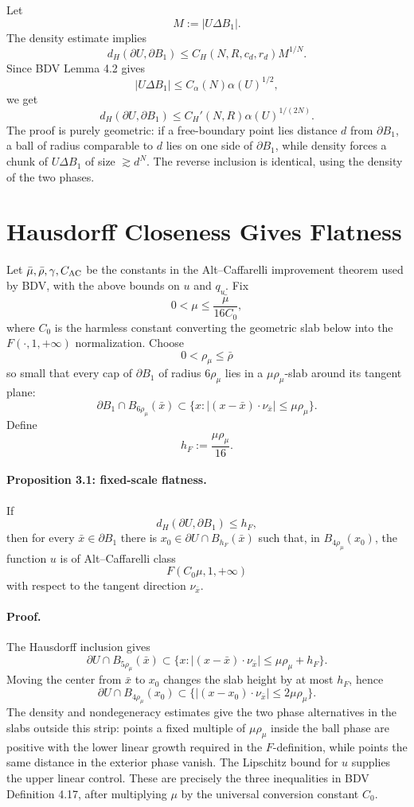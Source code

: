 \documentclass[11pt]{article}
\begin{document}
Let
\[
M:=|U\Delta B_1|.
\]
The density estimate implies
\[
d_H(\partial U,\partial B_1)
\le C_H(N,R,c_d,r_d)M^{1/N}.
\]
Since BDV Lemma 4.2 gives
\[
|U\Delta B_1|\le C_\alpha(N)\alpha(U)^{1/2},
\]
we get
\[
\boxed{
d_H(\partial U,\partial B_1)
\le
C_H'(N,R)\alpha(U)^{1/(2N)}.
}
\]
The proof is purely geometric: if a free-boundary point lies distance \(d\)
from \(\partial B_1\), a ball of radius comparable to \(d\) lies on one side of
\(\partial B_1\), while density forces a chunk of \(U\Delta B_1\) of size
\(\gtrsim d^N\). The reverse inclusion is identical, using the density of the
two phases.

\section{Hausdorff Closeness Gives Flatness}

Let \(\bar\mu,\bar\rho,\gamma,C_{\rm AC}\) be the constants in the
Alt--Caffarelli improvement theorem used by BDV, with the above bounds on
\(u\) and \(q_u\). Fix
\[
0<\mu\le \frac{\bar\mu}{16C_0},
\]
where \(C_0\) is the harmless constant converting the geometric slab below into
the \(F(\cdot,1,+\infty)\) normalization. Choose
\[
0<\rho_\mu\le \bar\rho
\]
so small that every cap of \(\partial B_1\) of radius \(6\rho_\mu\) lies in a
\(\mu\rho_\mu\)-slab around its tangent plane:
\[
\partial B_1\cap B_{6\rho_\mu}(\bar x)
\subset
\{x: |(x-\bar x)\cdot \nu_{\bar x}|\le \mu\rho_\mu\}.
\]
Define
\[
h_F:=\frac{\mu\rho_\mu}{16}.
\]

\paragraph{Proposition 3.1: fixed-scale flatness.}
If
\[
d_H(\partial U,\partial B_1)\le h_F,
\]
then for every \(\bar x\in\partial B_1\) there is
\(x_0\in\partial U\cap B_{h_F}(\bar x)\) such that, in
\(B_{4\rho_\mu}(x_0)\), the function \(u\) is of Alt--Caffarelli class
\[
F(C_0\mu,1,+\infty)
\]
with respect to the tangent direction \(\nu_{\bar x}\).

\paragraph{Proof.}
The Hausdorff inclusion gives
\[
\partial U\cap B_{5\rho_\mu}(\bar x)
\subset
\{x: |(x-\bar x)\cdot\nu_{\bar x}|
\le \mu\rho_\mu+h_F\}.
\]
Moving the center from \(\bar x\) to \(x_0\) changes the slab height by at most
\(h_F\), hence
\[
\partial U\cap B_{4\rho_\mu}(x_0)
\subset
\{|(x-x_0)\cdot\nu_{\bar x}|\le 2\mu\rho_\mu\}.
\]
The density and nondegeneracy estimates give the two phase alternatives in the
slabs outside this strip: points a fixed multiple of \(\mu\rho_\mu\) inside the
ball phase are positive with the lower linear growth required in the
\(F\)-definition, while points the same distance in the exterior phase vanish.
The Lipschitz bound for \(u\) supplies the upper linear control. These are
precisely the three inequalities in BDV Definition 4.17, after multiplying
\(\mu\) by the universal conversion constant \(C_0\).
\end{document}
